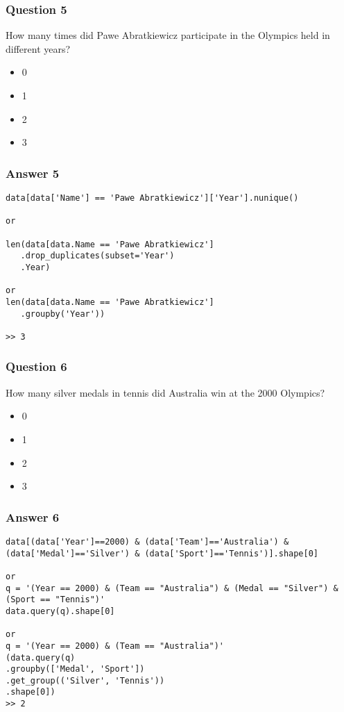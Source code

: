 \begin{frame}[fragile]\frametitle{Question 5}	
How many times did Pawe Abratkiewicz participate in the Olympics held in different years?
\begin{itemize}
\item 0
\item 1
\item 2
\item 3
\end{itemize}

\end{frame}

\begin{frame}[fragile]\frametitle{Answer 5}
\begin{lstlisting}
data[data['Name'] == 'Pawe Abratkiewicz']['Year'].nunique()

or

len(data[data.Name == 'Pawe Abratkiewicz']
   .drop_duplicates(subset='Year')
   .Year) 

or
len(data[data.Name == 'Pawe Abratkiewicz']
   .groupby('Year'))
   
>> 3
\end{lstlisting}
\end{frame}


\begin{frame}[fragile]\frametitle{Question 6}	
How many silver medals in tennis did Australia win at the 2000 Olympics?
\begin{itemize}
\item 0
\item 1
\item 2
\item 3
\end{itemize}

\end{frame}

\begin{frame}[fragile]\frametitle{Answer 6}
\begin{lstlisting}
data[(data['Year']==2000) & (data['Team']=='Australia') & (data['Medal']=='Silver') & (data['Sport']=='Tennis')].shape[0]

or
q = '(Year == 2000) & (Team == "Australia") & (Medal == "Silver") & (Sport == "Tennis")'
data.query(q).shape[0]

or
q = '(Year == 2000) & (Team == "Australia")'
(data.query(q)
.groupby(['Medal', 'Sport'])
.get_group(('Silver', 'Tennis'))
.shape[0])
>> 2
\end{lstlisting}

\end{frame}

